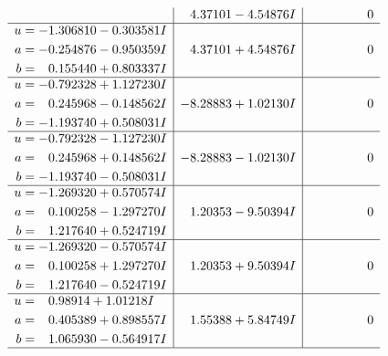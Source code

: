 \documentclass[1p]{elsarticle_modified}
\theoremstyle{definition}
\begin{document}
$$\begin{array}{c|c|c}
 & \phantom{-}4.37101 - 4.54876 I & \phantom{-0.000000 } 0 \\ \hline\begin{aligned}
u &= -1.306810 - 0.303581 I \\
a &= -0.254876 - 0.950359 I \\
b &= \phantom{-}0.155440 + 0.803337 I\end{aligned}
 & \phantom{-}4.37101 + 4.54876 I & \phantom{-0.000000 } 0 \\ \hline\begin{aligned}
u &= -0.792328 + 1.127230 I \\
a &= \phantom{-}0.245968 - 0.148562 I \\
b &= -1.193740 + 0.508031 I\end{aligned}
 & -8.28883 + 1.02130 I & \phantom{-0.000000 } 0 \\ \hline\begin{aligned}
u &= -0.792328 - 1.127230 I \\
a &= \phantom{-}0.245968 + 0.148562 I \\
b &= -1.193740 - 0.508031 I\end{aligned}
 & -8.28883 - 1.02130 I & \phantom{-0.000000 } 0 \\ \hline\begin{aligned}
u &= -1.269320 + 0.570574 I \\
a &= \phantom{-}0.100258 - 1.297270 I \\
b &= \phantom{-}1.217640 + 0.524719 I\end{aligned}
 & \phantom{-}1.20353 - 9.50394 I & \phantom{-0.000000 } 0 \\ \hline\begin{aligned}
u &= -1.269320 - 0.570574 I \\
a &= \phantom{-}0.100258 + 1.297270 I \\
b &= \phantom{-}1.217640 - 0.524719 I\end{aligned}
 & \phantom{-}1.20353 + 9.50394 I & \phantom{-0.000000 } 0 \\ \hline\begin{aligned}
u &= \phantom{-}0.98914 + 1.01218 I \\
a &= \phantom{-}0.405389 + 0.898557 I \\
b &= \phantom{-}1.065930 - 0.564917 I\end{aligned}
 & \phantom{-}1.55388 + 5.84749 I & \phantom{-0.000000 } 0\\
 \hline 
 \end{array}$$\newpage$$\begin{array}{c|c|c}  

\end{array}$$
\end{document}
